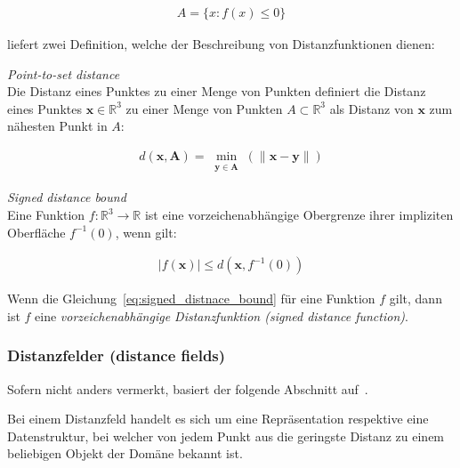 \begin{gather}
    A = \{ x : f(x) \leq 0 \}
\end{gather}

\cite{hart_sphere_1994} liefert zwei Definition, welche der Beschreibung von Distanzfunktionen dienen:

\theoremstyle{definition}
\begin{definition}{\label{theo:point_to_set_distance}
    \textit{Point-to-set distance}}\\
    Die Distanz eines Punktes zu einer Menge von Punkten definiert die Distanz
    eines Punktes $ \bm{x} \in \mathbb{R}^{3} $ zu einer Menge von Punkten $A
    \subset \mathbb{R}^{3}$ als Distanz von $\bm{x}$ zum nähesten Punkt in $A$:

    \begin{gather}
        d(\bm{x}, \bm{A}) = \min_{\substack{\bm{y} \in \bm{A}}}(\|\bm{x} - \bm{y}\|)
    \end{gather}
\end{definition}

\theoremstyle{definition}
\begin{definition}{\label{theo:signed_distnace_bound}
    \textit{Signed distance bound}}\\ 
    Eine Funktion $ f : \mathbb{R}^{3} \to \mathbb{R} $ ist eine
    vorzeichenabhängige Obergrenze ihrer impliziten Oberfläche $ f^{-1}(0)$,
    wenn gilt:

    \begin{gather}\label{eq:signed_distnace_bound}
        |f(\bm{x})| \leq d(\bm{x}, f^{-1}(0))
    \end{gather}
\end{definition}

Wenn die Gleichung~\ref{eq:signed_distnace_bound} für eine Funktion $f$ gilt,
dann ist $f$ eine \textit{vorzeichenabhängige Distanzfunktion (signed distance
    function)}.

\subsubsection{Distanzfelder (distance fields)}
\label{ssubsec:distance_fields}

Sofern nicht anders vermerkt, basiert der folgende Abschnitt
auf~\cite{jones_3d_2006}.

Bei einem Distanzfeld handelt es sich um eine Repräsentation respektive eine
Datenstruktur, bei welcher von jedem Punkt aus die geringste Distanz zu
einem beliebigen Objekt der Domäne bekannt ist.

